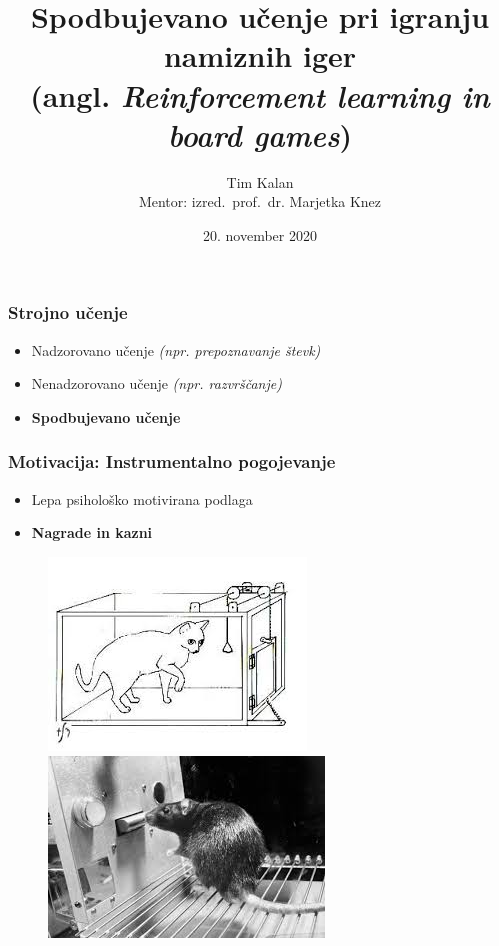 \documentclass{beamer}    %
\author{Tim Kalan \\ \medskip
        \footnotesize Mentor: izred.~prof.~dr. Marjetka Knez}
\institute[FMF]{Fakulteta za matematiko in fiziko}
\title{
    Spodbujevano učenje pri igranju namiznih iger \\ 
    \large (angl. \textit{Reinforcement learning in board games})}
\date{20. november 2020}
\begin{document}
\begin{frame}
    \titlepage
\end{frame}


\begin{frame}
    \frametitle{Strojno učenje}
    \begin{itemize}
        \item Nadzorovano učenje \textit{(npr. prepoznavanje števk)}
        \item Nenadzorovano učenje \textit{(npr. razvrščanje)}
        \item \textbf{Spodbujevano učenje}
    \end{itemize}
\end{frame}


\begin{frame}
    \frametitle{Motivacija: Instrumentalno pogojevanje}
    \begin{itemize}
        \item Lepa psihološko motivirana podlaga
        \item \textbf{Nagrade in kazni} 
    \end{itemize}

    \begin{figure}[b]
        \includegraphics[scale=0.47]{slike/macka.jpg}
        \includegraphics[scale=0.5]{slike/miska.jpg}
    \end{figure}
\end{frame}
\end{document}
